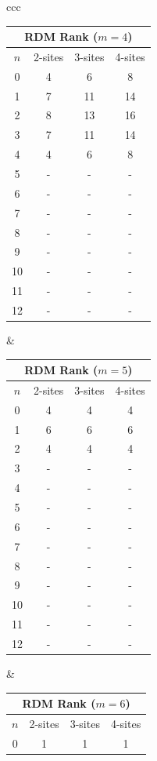\documentclass[11pt]{article}
\begin{document}
\begin{itemize}
\begin{itemize}
\begin{table}[H]
\begin{tabular}{ccc}
\begin{tabular}{|c|c|c|c|}
	\hline
	\multicolumn{4}{|c|}{\textbf{RDM Rank ($m = 4$)}} \\
	\hline
	$n$ & 2-sites & 3-sites & 4-sites \\
	\hline
	0 & 4 & 6 & 8 \\
	1 & 7 & 11 & 14 \\
	2 & 8 & 13 & 16 \\
	3 & 7 & 11 & 14 \\
	4 & 4 & 6 & 8 \\
	5 & - & - & - \\
	6 & - & - & - \\
	7 & - & - & - \\
	8 & - & - & - \\
	9 & - & - & - \\
	10 & - & - & - \\
	11 & - & - & - \\
	12 & - & - & - \\
	\hline
\end{tabular}
&
\begin{tabular}{|c|c|c|c|}
	\hline
	\multicolumn{4}{|c|}{\textbf{RDM Rank ($m = 5$)}} \\
	\hline
	$n$ & 2-sites & 3-sites & 4-sites \\
	\hline
	0 & 4 & 4 & 4 \\
	1 & 6 & 6 & 6 \\
	2 & 4 & 4 & 4 \\
	3 & - & - & - \\
	4 & - & - & - \\
	5 & - & - & - \\
	6 & - & - & - \\
	7 & - & - & - \\
	8 & - & - & - \\
	9 & - & - & - \\
	10 & - & - & - \\
	11 & - & - & - \\
	12 & - & - & - \\
	\hline
\end{tabular}
&
\begin{tabular}{|c|c|c|c|}
	\hline
	\multicolumn{4}{|c|}{\textbf{RDM Rank ($m = 6$)}} \\
	\hline
	$n$ & 2-sites & 3-sites & 4-sites \\
	\hline
	0 & 1 & 1 & 1 \\

\end{tabular}
\end{tabular}
\end{table}
\end{itemize}
\end{itemize}
\end{document}
